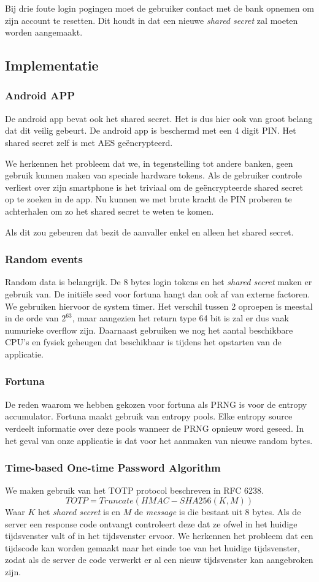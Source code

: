 \documentclass[11pt]{article}
\begin{document}
Bij drie foute login pogingen moet de gebruiker contact met de bank opnemen om zijn account te resetten. Dit houdt in dat een nieuwe \emph{shared secret} zal moeten worden aangemaakt.
\subsection{Implementatie}
\subsubsection{Android APP}
De android app bevat ook het shared secret. Het is dus hier ook van groot belang dat dit veilig gebeurt. 
De android app is beschermd met een 4 digit PIN. Het shared secret zelf is met AES ge\"encrypteerd. 

We herkennen het probleem dat we, in tegenstelling tot andere banken, geen gebruik kunnen maken van speciale hardware tokens. Als de gebruiker controle verliest over zijn smartphone is het triviaal om de ge\"encrypteerde shared secret op te zoeken in de app. Nu kunnen we met brute kracht de PIN proberen te achterhalen om zo het shared secret te weten te komen. 

Als dit zou gebeuren dat bezit de aanvaller enkel en alleen het shared secret.
\subsubsection{Random events}
Random data is belangrijk. De 8 bytes login tokens en het \emph{shared secret} maken er gebruik van.
De initi\"ele seed voor fortuna hangt dan ook af van externe factoren. We gebruiken hiervoor de system timer. Het verschil tussen 2 oproepen is meestal in de orde van $2^63$, maar aangezien het return type 64 bit is zal er dus vaak numurieke overflow zijn. Daarnaast gebruiken we nog het aantal beschikbare CPU's en fysiek geheugen dat beschikbaar is tijdens het opstarten van de applicatie.
\subsubsection{Fortuna}
\label{sec:fortuna}
De reden waarom we hebben gekozen voor fortuna als PRNG is voor de entropy accumulator. Fortuna maakt gebruik van entropy pools. Elke entropy source verdeelt informatie over deze pools wanneer de PRNG opnieuw word geseed. In het geval van onze applicatie is dat voor het aanmaken van nieuwe random bytes.

\subsubsection{Time-based One-time Password Algorithm}
\label{sec:totp}
We maken gebruik van het TOTP protocol beschreven in RFC 6238.
$$ TOTP = Truncate(HMAC-SHA256(K,M))$$
Waar $K$ het \emph{shared secret} is en $M$ de \emph{message} is die bestaat uit 8 bytes. Als de server een response code ontvangt controleert deze dat ze ofwel in het huidige tijdsvenster valt of in het tijdsvenster ervoor. We herkennen het probleem dat een tijdscode kan worden gemaakt naar het einde toe van het huidige tijdsvenster, zodat als de server de code verwerkt er al een nieuw tijdsvenster kan aangebroken zijn.\\
\end{document}
